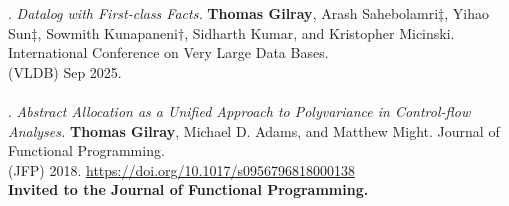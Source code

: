 \paper. \textit{Datalog with First-class Facts.}
\textbf{Thomas Gilray}, Arash Sahebolamri$\ddagger$, Yihao Sun$\ddagger$, Sowmith Kunapaneni$\dagger$, Sidharth Kumar, and Kristopher Micinski.
International Conference on Very Large Data Bases.
\\(VLDB) Sep 2025.
\\ \vspace{-0.1cm}\\
\paper. \textit{Abstract Allocation as a Unified Approach to Polyvariance in Control-flow Analyses.}
\textbf{Thomas Gilray}, Michael D. Adams, and Matthew Might.
Journal of Functional Programming.
\\(JFP) 2018. \url{https://doi.org/10.1017/s0956796818000138}
\\\textbf{Invited to the Journal of Functional Programming.} \\ \vspace{-0.1cm}\\
